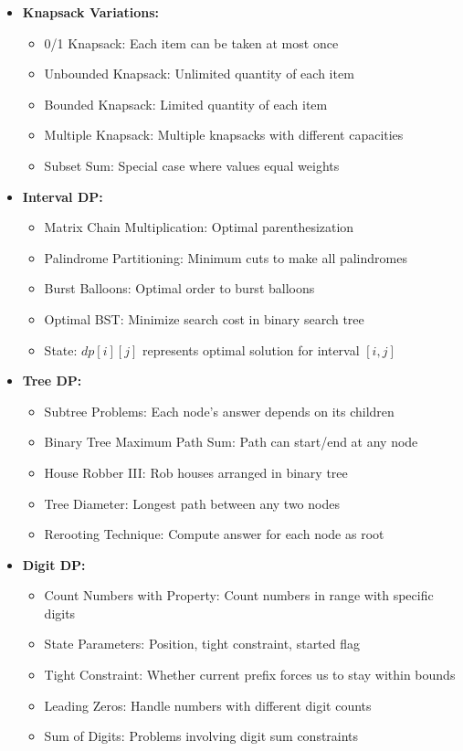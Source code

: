 \documentclass[a4paper,10pt]{book}
\begin{document}
\begin{itemize}[leftmargin=*]
    \item \textbf{Knapsack Variations:}
    \begin{itemize}
        \item 0/1 Knapsack: Each item can be taken at most once
        \item Unbounded Knapsack: Unlimited quantity of each item
        \item Bounded Knapsack: Limited quantity of each item
        \item Multiple Knapsack: Multiple knapsacks with different capacities
        \item Subset Sum: Special case where values equal weights
    \end{itemize}

    \item \textbf{Interval DP:}
    \begin{itemize}
        \item Matrix Chain Multiplication: Optimal parenthesization
        \item Palindrome Partitioning: Minimum cuts to make all palindromes
        \item Burst Balloons: Optimal order to burst balloons
        \item Optimal BST: Minimize search cost in binary search tree
        \item State: $dp[i][j]$ represents optimal solution for interval $[i,j]$
    \end{itemize}

    \item \textbf{Tree DP:}
    \begin{itemize}
        \item Subtree Problems: Each node's answer depends on its children
        \item Binary Tree Maximum Path Sum: Path can start/end at any node
        \item House Robber III: Rob houses arranged in binary tree
        \item Tree Diameter: Longest path between any two nodes
        \item Rerooting Technique: Compute answer for each node as root
    \end{itemize}

    \item \textbf{Digit DP:}
    \begin{itemize}
        \item Count Numbers with Property: Count numbers in range with specific digits
        \item State Parameters: Position, tight constraint, started flag
        \item Tight Constraint: Whether current prefix forces us to stay within bounds
        \item Leading Zeros: Handle numbers with different digit counts
        \item Sum of Digits: Problems involving digit sum constraints
    \end{itemize}


\end{itemize}
\end{document}
